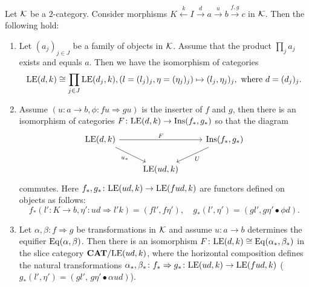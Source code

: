 \begin{lemma}\label{lem:PIEExtensionsFunctors}
    Let $\mathcal{K}$ be a $2$-category. Consider morphisms $K\xleftarrow{k} I\xrightarrow{d} a\xrightarrow{u} b\xrightarrow{f,g} c$ in $\mathcal{K}$. Then the following hold:
    \begin{enumerate}
        \item Let $(a_j)_{j\in J}$ be a family of objects in $\mathcal{K}$. Assume that the product $\prod_j a_j$ exists and equals $a$. Then we have the isomorphism of categories
        $$
        \mathrm{LE}(d,k) \cong \prod_{j\in J}\mathrm{LE}(d_j,k), (l = (l_j)_j,\eta = (\eta_j)_j)\mapsto (l_j,\eta_j)_j, \text{ where $d = (d_j)_j.$}
        $$      
        \item Assume $(u\colon a\to b,\phi\colon fu\Rightarrow gu)$ is the inserter of $f$ and $g$, then there is an isomorphism of categories $F\colon \mathrm{LE}(d,k)\to \mathrm{Ins}(f_*,g_*)$ so that the diagram
        $$
        \begin{tikzcd}
{\LE(d,k)} \arrow[rr, "F"] \arrow[rd, "u_*"'] &             & {\Ins(f_*,g_*)} \arrow[ld, "U"] \\
                                              & {\LE(ud,k)} &                                
\end{tikzcd}
        $$
        commutes. Here $f_*,g_*\colon \mathrm{LE}(ud,k)\to \mathrm{LE}(fud,k)$ are functors defined on objects as follows:
        $$
        f_*(l'\colon K\to b,\eta'\colon ud\Rightarrow l'k) = (fl',f\eta'), \quad g_*(l',\eta') = (gl',g\eta'\bullet \phi d).
        $$
        \item Let $\alpha,\beta\colon f\Rightarrow g$ be transformations in $\mathcal{K}$ and assume $u\colon a\to b$ determines the equifier $\mathrm{Eq}(\alpha,\beta)$. Then there is an isomorphism $F\colon \mathrm{LE}(d,k)\cong \mathrm{Eq}(\alpha_*,\beta_*)$ in the slice category $\mathbf{CAT}/\mathrm{LE}(ud,k)$, where the horizontal composition defines the natural transformations $\alpha_*,\beta_*\colon f_*\Rightarrow g_*\colon \mathrm{LE}(ud,k)\to \mathrm{LE}(fud,k)$ ($g_*(l',\eta')=(gl',\,g\eta'\bullet\alpha ud)$).
    \end{enumerate}
\end{lemma}
